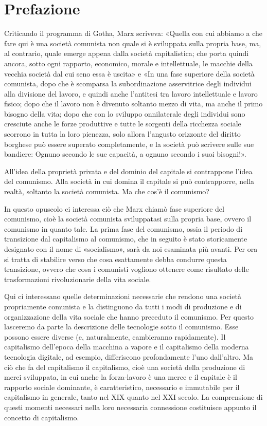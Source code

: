 \documentclass[../main]{subfiles}
\begin{document}
\ifSubfilesClassLoaded{\setcounter{page}{7}}{}
\section{Prefazione}
\label{sec:02_prefazione}

Criticando il programma di Gotha, Marx scriveva: «Quella con cui abbiamo a che fare qui è una società comunista non quale si è sviluppata sulla propria base, ma, al contrario, quale emerge appena dalla società capitalistica; che porta quindi ancora, sotto ogni rapporto, economico, morale e intellettuale, le macchie della vecchia società dal cui seno essa è uscita» e «In una fase superiore della società comunista, dopo che è scomparsa la subordinazione asservitrice degli individui alla divisione del lavoro, e quindi anche l'antitesi tra lavoro intellettuale e lavoro fisico; dopo che il lavoro non è divenuto soltanto mezzo di vita, ma anche il primo bisogno della vita; dopo che con lo sviluppo onnilaterale degli individui sono cresciute anche le forze produttive e tutte le sorgenti della ricchezza sociale scorrono in tutta la loro pienezza, solo allora l'angusto orizzonte del diritto borghese può essere superato completamente, e la società può scrivere sulle sue bandiere: Ognuno secondo le sue capacità, a ognuno secondo i suoi bisogni!».

All'idea della proprietà privata e del dominio del capitale si contrappone l'idea del comunismo. Alla società in cui domina il capitale si può contrapporre, nella realtà, soltanto la società comunista. Ma che cos'è il comunismo?

In questo opuscolo ci interessa ciò che Marx chiamò fase superiore del comunismo, cioè la società comunista sviluppatasi sulla propria base, ovvero il comunismo in quanto tale. La prima fase del comunismo, ossia il periodo di transizione dal capitalismo al comunismo, che in seguito è stato storicamente designato con il nome di «socialismo», sarà da noi esaminata più avanti. Per ora si tratta di stabilire verso che cosa esattamente debba condurre questa transizione, ovvero che cosa i comunisti vogliono ottenere come risultato delle trasformazioni rivoluzionarie della vita sociale.

Qui ci interessano quelle determinazioni necessarie che rendono una società propriamente comunista e la distinguono da tutti i modi di produzione e di organizzazione della vita sociale che hanno preceduto il comunismo. Per questo lasceremo da parte la descrizione delle tecnologie sotto il comunismo. Esse possono essere diverse (e, naturalmente, cambieranno rapidamente). Il capitalismo dell'epoca della macchina a vapore e il capitalismo della moderna tecnologia digitale, ad esempio, differiscono profondamente l'uno dall'altro. Ma ciò che fa del capitalismo il capitalismo, cioè una società della produzione di merci sviluppata, in cui anche la forza-lavoro è una merce e il capitale è il rapporto sociale dominante, è caratteristico, necessario e immutabile per il capitalismo in generale, tanto nel XIX quanto nel XXI secolo. La comprensione di questi momenti necessari nella loro necessaria connessione costituisce appunto il concetto di capitalismo.
\end{document}
